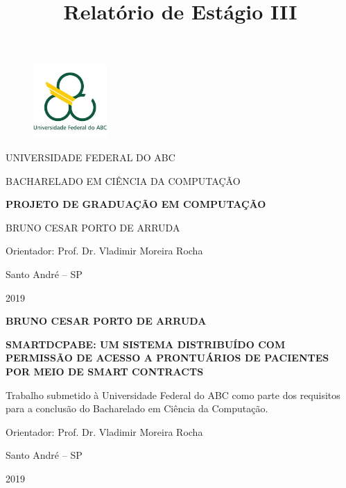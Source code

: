 \documentclass[a4paper,11pt]{article}
\title{Relatório de Estágio III}
\begin{document}


\begin{titlepage}

\begin{figure}
	\label{Logo UFABC}
	\vspace{-1\baselineskip}
	\centering
	\includegraphics[width=0.25\textwidth]{images/Logo_UFABC}
\end{figure}

\uppercase{Universidade Federal do ABC}

\uppercase{Bacharelado em Ciência da Computação}

\vfill
\begin{center}

\uppercase{\textbf{Projeto de Graduação em Computação}}

\vfill

\uppercase{Bruno Cesar Porto de Arruda}
\vspace{1cm}

Orientador: Prof. Dr. Vladimir Moreira Rocha

\vfill

Santo André -- SP

2019
\end{center}
\end{titlepage}



\begin{titlepage}
\begin{center}
\uppercase{\textbf{Bruno Cesar Porto de Arruda}}

\vfill

\uppercase{\textbf{SmartDCPABE: Um sistema distribuído com permissão de acesso a prontuários de pacientes por meio de Smart Contracts}}
\end{center}

\vfill

\hfill \begin{minipage}{0.5\textwidth}
Trabalho submetido à Universidade Federal do ABC como parte dos requisitos para a conclusão do Bacharelado em Ciência da Computação.
\vspace{1cm}

Orientador: Prof. Dr. Vladimir Moreira Rocha
\end{minipage}

\vfill

\begin{center}
Santo André -- SP

2019
\end{center}
\end{titlepage}
\end{document}
